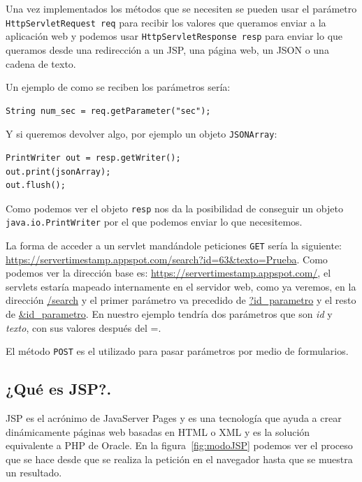 \begin{itemize}
Una vez implementados los métodos que se necesiten se pueden usar el parámetro \lstinline{HttpServletRequest req} para recibir los valores que queramos enviar a la aplicación web y podemos usar \lstinline{HttpServletResponse resp} para enviar lo que queramos desde una redirección a un JSP, una página web, un JSON o una cadena de texto. 

Un ejemplo de como se reciben los parámetros sería: 

\begin{lstlisting}[style=Java]  
String num_sec = req.getParameter("sec");
\end{lstlisting}

Y si queremos devolver algo, por ejemplo un objeto \lstinline{JSONArray}:

\begin{lstlisting}[style=Java]   
PrintWriter out = resp.getWriter();
out.print(jsonArray);
out.flush();
\end{lstlisting}

Como podemos ver el objeto \lstinline{resp} nos da la posibilidad de conseguir un objeto \lstinline{java.io.PrintWriter} por el que podemos enviar lo que necesitemos.

La forma de acceder a un servlet mandándole peticiones \lstinline{GET} sería la siguiente: \url{https://servertimestamp.appspot.com/search?id=63&texto=Prueba}. Como podemos ver la dirección base es: \url{https://servertimestamp.appspot.com/}, el servlets estaría mapeado internamente en el servidor web, como ya veremos, en la dirección \url{/search} y el primer parámetro va precedido de \url{?id\_parametro} y el resto de \url{\&id\_parametro}. En nuestro ejemplo tendría dos parámetros que son \textit{id} y \textit{texto}, con sus valores después del =.

El método \lstinline{POST} es el utilizado para pasar parámetros por medio de formularios.

\subsection{¿Qué es JSP?.}
JSP es el acrónimo de JavaServer Pages y es una tecnología que ayuda a crear dinámicamente páginas web basadas en HTML o XML y es la solución equivalente a PHP de Oracle. En la figura~\ref{fig:modoJSP} podemos ver el proceso que se hace desde que se realiza la petición en el navegador hasta que se muestra un resultado.


\end{itemize}
